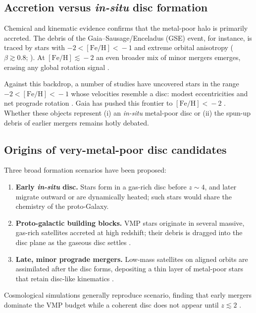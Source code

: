 \documentclass[a4paper,12pt]{article}
\begin{document}
\subsection{Accretion versus {\it in-situ} disc formation}
\label{subsec:accretion_vs_insitu}

Chemical and kinematic evidence confirms that the metal-poor halo 
is primarily accreted.  The debris of the Gaia–Sausage/Enceladus (GSE) event, for instance, 
is traced by stars with $-2\!<\![\mathrm{Fe/H}]\!<\!-1$ and extreme orbital anisotropy 
($\beta\!\gtrsim\!0.8$; \citealt{Belokurov2018,Helmi2018}).  
At $[\mathrm{Fe/H}]\!\lesssim\!-2$ an even broader mix of minor mergers emerges, 
erasing any global rotation signal \citep{Lancaster2019,Bird2021}.  

Against this backdrop, a number of studies have uncovered stars in the range 
$-2\!<\![\mathrm{Fe/H}]\!<\!-1$ whose velocities resemble a disc:  
modest eccentricities and net prograde rotation 
\citep{Norris1985,Chiba2000,Carollo2019,An2020}.  
Gaia has pushed this frontier to $[\mathrm{Fe/H}]\!<\!-2$  
\citep{Sestito2019,Venn2020,Cordoni2020,Mardini2022}.  
Whether these objects represent (i) an {\it in-situ} metal-poor disc or (ii) the spun-up debris of  
earlier mergers remains hotly debated.

\subsection{Origins of very-metal-poor disc candidates}
\label{subsec:origins_VMP_disc}

Three broad formation scenarios have been proposed:
\begin{enumerate}
    \item \textbf{Early {\it in-situ} disc.}  
          Stars form in a gas-rich disc before $z\!\sim\!4$, and later migrate outward 
          or are dynamically heated; such stars would share the chemistry of the proto-Galaxy. 
    \item \textbf{Proto-galactic building blocks.}  
          VMP stars originate in several massive, gas-rich satellites accreted at high redshift;  
          their debris is dragged into the disc plane as the gaseous disc settles 
          \citep[e.g.][]{Sestito2020}. 
    \item \textbf{Late, minor prograde mergers.}  
          Low-mass satellites on aligned orbits are assimilated after the disc forms,  
          depositing a thin layer of metal-poor stars that retain disc-like kinematics 
          \citep{Santistevan2021}.
\end{enumerate}
Cosmological simulations generally reproduce scenario,  
finding that early mergers dominate the VMP budget while a coherent disc does not appear  
until $z\!\lesssim\!2$ \citep{Gurvich2023}.  
\end{document}
